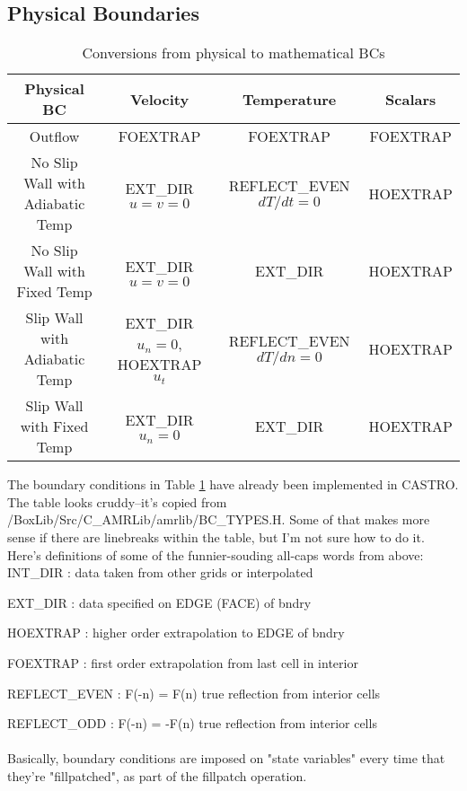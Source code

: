 \subsection{Physical Boundaries}
\begin{table}[h]
\begin{scriptsize}
\begin{center}
\begin{tabular}{|c|c|c|c|} \hline
Physical BC & Velocity & Temperature & Scalars \\
\hline
Outflow & FOEXTRAP & FOEXTRAP & FOEXTRAP \\
No Slip Wall with Adiabatic Temp & EXT\_DIR $u=v=0$ & REFLECT\_EVEN $dT/dt=0$ & HOEXTRAP \\
No Slip Wall with Fixed Temp & EXT\_DIR $u=v=0$ & EXT\_DIR & HOEXTRAP \\
Slip Wall with Adiabatic Temp & EXT\_DIR $u_n=0$, HOEXTRAP $u_t$ & REFLECT\_EVEN $dT/dn=0$ & HOEXTRAP \\
Slip Wall with Fixed Temp & EXT\_DIR $u_n=0$ & EXT\_DIR & HOEXTRAP \\
\hline
\end{tabular}
\end{center}
\caption{Conversions from physical to mathematical BCs}
\label{Table:BC}
\end{scriptsize}
\end{table}
The boundary conditions in Table \ref{Table:BC} have already been implemented in CASTRO.  
The table looks cruddy--it's copied from /BoxLib/Src/C_AMRLib/amrlib/BC\_TYPES.H. 
Some of that makes more sense if there are linebreaks within the table, 
but I'm not sure how to do it. Here's definitions of some of the funnier-souding all-caps words from above:\\

INT\_DIR  : data taken from other grids or interpolated

EXT\_DIR  : data specified on EDGE (FACE) of bndry

HOEXTRAP  : higher order extrapolation to EDGE of bndry

FOEXTRAP  : first order extrapolation from last cell in interior

REFLECT\_EVEN : F(-n) = F(n) true reflection from interior cells

REFLECT\_ODD  : F(-n) = -F(n) true reflection from interior cells\\ \\
Basically, boundary conditions are imposed on "state variables" every time that they're "fillpatched", as part of the fillpatch operation.


